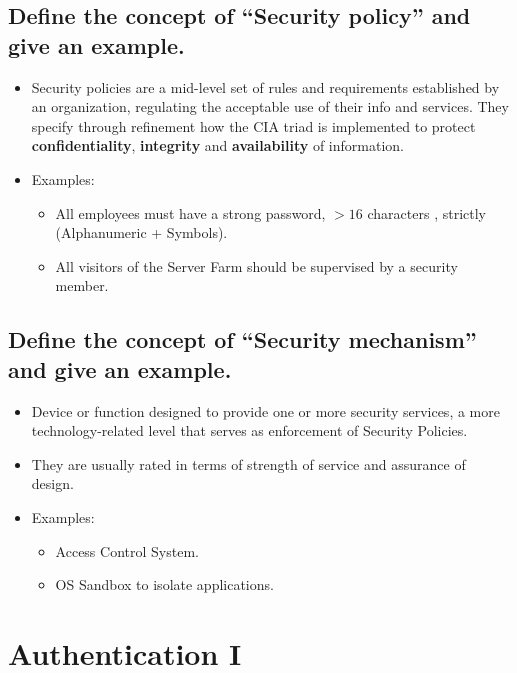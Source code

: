 \documentclass[9pt, letterpaper]{article}
\begin{document}
\subsection{Define the concept of “Security policy” and give an example.}
\begin{itemize}
	\item Security policies are a mid-level set of rules and requirements established by an organization, regulating the acceptable use of their info and services. They specify through refinement how the CIA triad is implemented to protect \textbf{confidentiality}, \textbf{integrity} and \textbf{availability} of information.
	\item Examples: 
		\begin{itemize}
			\item All employees must have a strong password, $>16$ characters , strictly (Alphanumeric + Symbols).
			\item  All visitors of the Server Farm should be supervised by a security member.
		\end{itemize}		 
\end{itemize}


\subsection{Define the concept of “Security mechanism” and give an example.}
\begin{itemize}
	\item Device or function designed to provide one or more security services, a more technology-related level that serves as enforcement of Security Policies. 
	\item They are usually rated in terms of strength of service and assurance of design.
	\item Examples:
	\begin{itemize}
		\item Access Control System.
		\item OS Sandbox to isolate applications.
	\end{itemize}
\end{itemize}

\newpage

\section{Authentication I}
\end{document}
